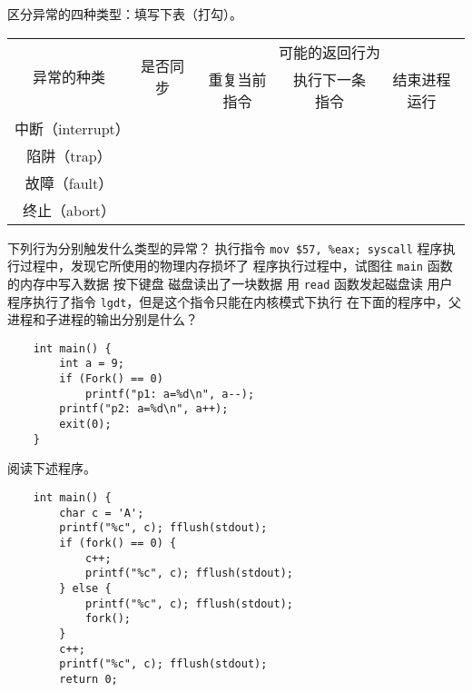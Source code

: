     \begin{problems}
        \pro 区分异常的四种类型：填写下表（打勾）。
        \begin{table}[H]
            \centering
            \begin{tabular}{|c|c|ccc|}
                \hline
                \multirow{2}{*}{异常的种类} & \multirow{2}{*}{是否同步} & \multicolumn{3}{c|}{可能的返回行为} \\ \cline{3-5} 
                &  & \multicolumn{1}{c|}{重复当前指令} & \multicolumn{1}{c|}{执行下一条指令} & 结束进程运行 \\ \hline
                中断（interrupt） & \rule{0pt}{3ex} & \multicolumn{1}{c|}{} & \multicolumn{1}{c|}{} &  \\ \hline
                陷阱（trap） & \rule{0pt}{3ex} & \multicolumn{1}{c|}{} & \multicolumn{1}{c|}{} &  \\ \hline
                故障（fault） & \rule{0pt}{3ex} & \multicolumn{1}{c|}{} & \multicolumn{1}{c|}{} &  \\ \hline
                终止（abort） & \rule{0pt}{3ex} & \multicolumn{1}{c|}{} & \multicolumn{1}{c|}{} &  \\ \hline
            \end{tabular}
        \end{table}
        \pro 下列行为分别触发什么类型的异常？
            \qn 执行指令 \verb|mov $57, %eax; syscall|
            \qn 程序执行过程中，发现它所使用的物理内存损坏了
            \qn 程序执行过程中，试图往 \verb|main| 函数的内存中写入数据
            \qn 按下键盘
            \qn 磁盘读出了一块数据
            \qn 用 \verb|read| 函数发起磁盘读
            \qn 用户程序执行了指令 \verb|lgdt|，但是这个指令只能在内核模式下执行
        \pro 在下面的程序中，父进程和子进程的输出分别是什么？
        \begin{verbatim}
    int main() {
        int a = 9;
        if (Fork() == 0)
            printf("p1: a=%d\n", a--);
        printf("p2: a=%d\n", a++);
        exit(0);
    }
        \end{verbatim}
        \pro 阅读下述程序。
        \begin{verbatim}
    int main() {
        char c = 'A';
        printf("%c", c); fflush(stdout);
        if (fork() == 0) {
            c++;
            printf("%c", c); fflush(stdout);
        } else {
            printf("%c", c); fflush(stdout);
            fork();
        }
        c++;
        printf("%c", c); fflush(stdout);
        return 0;

\end{verbatim}
\end{problems}
